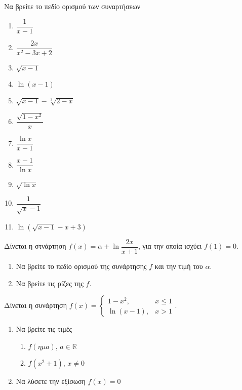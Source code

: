 \documentclass{presentation}
\begin{document}
\begin{askisi}
      Να βρείτε το πεδίο ορισμού των συναρτήσεων

      \begin{multicols}{2}
            \begin{enumerate}
                  \item<1-> $\dfrac{1}{x-1}$
                  \item<2-> $\dfrac{2x}{x^2-3x+2}$
                  \item<3-> $\sqrt{x-1}$
                  \item<4-> $\ln (x-1)$
                  \item<5-> $\sqrt{x-1}-\sqrt[3]{2-x}$
                  \item<6-> $\dfrac{\sqrt{1-x^2}}{x}$
                  \item<7-> $\dfrac{\ln x}{x-1}$
                  \item<8-> $\dfrac{x-1}{\ln x}$
                  \item<9-> $\sqrt{\ln x}$
                  \item<10-> $\dfrac{1}{\sqrt{x}-1}$
                  \item<11-> $\ln \left(\sqrt{x-1}-x+3\right)$
            \end{enumerate}
      \end{multicols}
\end{askisi}

\begin{askisi}
      Δίνεται η στνάρτηση $f(x)=α+\ln \dfrac{2x}{x+1}$, για την οποία ισχύει $f(1)=0$.
      \begin{enumerate}
            \item<1-> Να βρείτε το πεδίο ορισμού της συνάρτησης $f$ και την τιμή του $α$.
            \item<2-> Να βρείτε τις ρίζες της $f$.
      \end{enumerate}
\end{askisi}

\begin{askisi}
      Δίνεται η συνάρτηση $f(x)=\begin{cases}
                  1-x^2,     & x\le 1 \\
                  \ln (x-1), & x>1
            \end{cases}$.
      \begin{enumerate}
            \item<1-> Να βρείτε τις τιμές
                  \begin{enumerate}
                        \item<1-> $f(ημ a)$, $a\in\mathbb{R}$
                        \item<2-> $f(x^2+1)$, $x\ne 0$
                  \end{enumerate}
            \item<3-> Να λύσετε την εξίσωση $f(x)=0$
      \end{enumerate}
\end{askisi}
\end{document}
